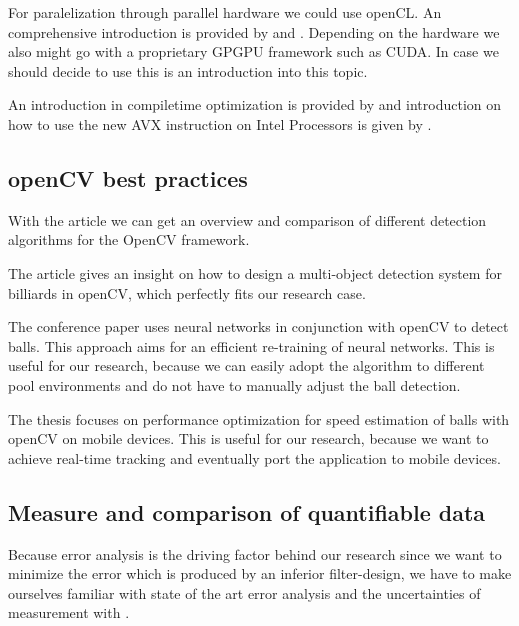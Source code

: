 \documentclass[titlepage, a4paper, 11pt]{scrartcl}
\begin{document}
        For paralelization through parallel hardware we could use openCL. An comprehensive introduction is provided by \cite{trevett2013opencl} and \cite{tompson2012introduction}.
        Depending on the hardware we also might go with a proprietary GPGPU framework such as CUDA. In case we should decide to use this \cite{nickolls2008scalable} is an introduction into this topic.

        An introduction in compiletime optimization is provided by \cite{hohenauer2006retargetable} and introduction on how to use the new AVX instruction on Intel Processors is given by \cite{cornea2015intel}.

        \subsection{openCV best practices}

        With the article \cite{janku2016comparison} we can get an overview and comparison of different detection algorithms for the OpenCV framework.

        The article \cite{gao2018design} gives an insight on how to design a multi-object detection system for billiards in openCV, which perfectly fits our research case.

        The conference paper \cite{gabel2018jetson} uses neural networks in conjunction with openCV to detect balls.
        This approach aims for an efficient re-training of neural networks. This is useful for our research, because we can easily adopt the algorithm to different pool environments and do not have to manually adjust the ball detection.

        The thesis \cite{schmidt2016measuring} focuses on performance optimization for speed estimation of balls with openCV on mobile devices. This is useful for our research, because we want to achieve real-time tracking and eventually port the application to mobile devices.

        \subsection{Measure and comparison of quantifiable data}

        Because error analysis is the driving factor behind our research since we want to minimize the error which is produced by an inferior filter-design, we have to make ourselves familiar with
        state of the art error analysis and the uncertainties of measurement with \cite{taylor1997introduction}. 
\end{document}
